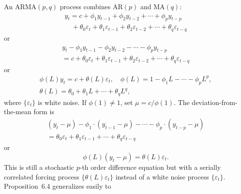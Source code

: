 An $\text{ARMA}(p, q)$ process combines $\text{AR}(p)$ and $\text{MA}(q)$:
\begin{equation}
\begin{gathered}
  y_t = c + \phi_1 y_{t-1} + \phi_2 y_{t-2} + \cdots + \phi_p y_{t-p} \\
  \quad + \theta_0 \varepsilon_t + \theta_1 \varepsilon_{t-1} + \theta_2 \varepsilon_{t-2} + \cdots + \theta_q \varepsilon_{t-q}
\end{gathered}
\end{equation}
or
\begin{equation}
\begin{gathered}
  y_t - \phi_1 y_{t-1} - \phi_2 y_{t-2} - \cdots - \phi_p y_{t-p} \\
  = c + \theta_0 \varepsilon_t + \theta_1 \varepsilon_{t-1} + \theta_2 \varepsilon_{t-2} + \cdots + \theta_q \varepsilon_{t-q}
\end{gathered}
\end{equation}
or
\begin{equation}
\begin{gathered}
  \phi(L) y_t = c + \theta(L) \varepsilon_t, \quad
  \phi(L) = 1 - \phi_1 L - \cdots - \phi_p L^p, \\
  \theta(L) = \theta_0 + \theta_1 L + \cdots + \theta_q L^q,
\end{gathered}
\label{eq:6.2.9}
\end{equation}
where $\{\varepsilon_t\}$ is white noise. If $\phi(1) \neq 1$, set $\mu = c/\phi(1)$. The deviation-from-the-mean
form is
\begin{equation}
\begin{gathered}
  (y_t - \mu) - \phi_1 \cdot (y_{t-1} - \mu) - \cdots - \phi_p \cdot (y_{t-p} - \mu) \\
  = \theta_0 \varepsilon_t + \theta_1 \varepsilon_{t-1} + \cdots + \theta_q \varepsilon_{t-q}
\end{gathered}
\end{equation}
or
\begin{equation}
  \phi(L)(y_t - \mu) = \theta(L) \varepsilon_t.
  \label{eq:6.2.9prime}
  \tag{6.2.9$'$}
\end{equation}
This is still a stochastic $p$-th order difference equation but with a serially correlated
forcing process $\{\theta(L) \varepsilon_t\}$ instead of a white noise process $\{\varepsilon_t\}$. Proposition~6.4
generalizes easily to

